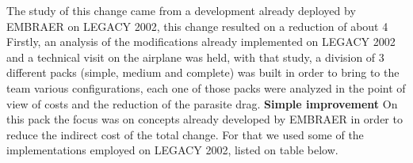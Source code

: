 ﻿The study of this change came from a development already deployed by EMBRAER on LEGACY 2002, this change resulted on a reduction of about 4%
Firstly, an analysis of the modifications already implemented on LEGACY 2002 and a technical visit on the airplane was held, with that study, a division of 3 different packs (simple, medium and complete) was built in order to bring to the team various configurations, each one of those packs were analyzed in the point of view of costs and the reduction of the parasite drag.
\textbf{Simple improvement}
On this pack the focus was on concepts already developed by EMBRAER in order to reduce the indirect cost of the total change. For that we used some of the implementations employed on LEGACY 2002, listed on table below.

